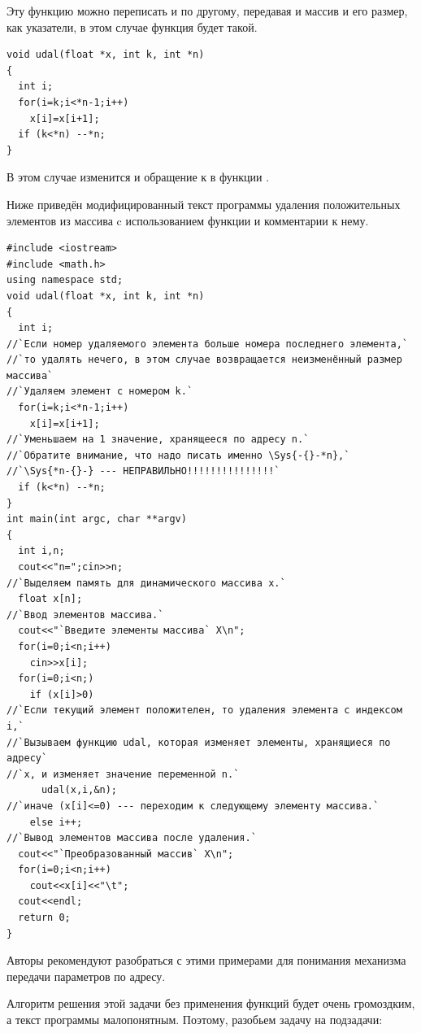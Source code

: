 Эту функцию можно переписать и по другому, передавая и массив и его размер, как указатели, в этом случае функция будет
такой.
\begin{lstlisting}
void udal(float *x, int k, int *n)
{
  int i;
  for(i=k;i<*n-1;i++)
    x[i]=x[i+1];
  if (k<*n) --*n;
}
\end{lstlisting}

В этом случае изменится и обращение к  в функции . 

Ниже приведён модифицированный текст программы удаления положительных элементов из массива  c
использованием функции  и комментарии к нему.
\begin{lstlisting}
#include <iostream>
#include <math.h>
using namespace std;
void udal(float *x, int k, int *n)
{
  int i;
//`Если номер удаляемого элемента больше номера последнего элемента,`
//`то удалять нечего, в этом случае возвращается неизменённый размер массива`
//`Удаляем элемент с номером k.`
  for(i=k;i<*n-1;i++)
    x[i]=x[i+1];
//`Уменьшаем на 1 значение, хранящееся по адресу n.`
//`Обратите внимание, что надо писать именно \Sys{-{}-*n},`
//`\Sys{*n-{}-} --- НЕПРАВИЛЬНО!!!!!!!!!!!!!!!`
  if (k<*n) --*n;
}
int main(int argc, char **argv)
{
  int i,n;
  cout<<"n=";cin>>n;
//`Выделяем память для динамического массива x.`
  float x[n];
//`Ввод элементов массива.`
  cout<<"`Введите элементы массива` X\n";
  for(i=0;i<n;i++)
    cin>>x[i];
  for(i=0;i<n;)
    if (x[i]>0)
//`Если текущий элемент положителен, то удаления элемента с индексом i,` 
//`Вызываем функцию udal, которая изменяет элементы, хранящиеся по адресу`
//`x, и изменяет значение переменной n.`
      udal(x,i,&n);
//`иначе (x[i]<=0) --- переходим к следующему элементу массива.`
    else i++;
//`Вывод элементов массива после удаления.`
  cout<<"`Преобразованный массив` X\n";
  for(i=0;i<n;i++)
    cout<<x[i]<<"\t";
  cout<<endl;
  return 0;
}
\end{lstlisting}

Авторы рекомендуют разобраться с этими примерами для понимания механизма передачи параметров по адресу.


Алгоритм решения этой задачи без применения функций будет очень громоздким, а текст программы малопонятным. Поэтому,
разобьем задачу на подзадачи:

